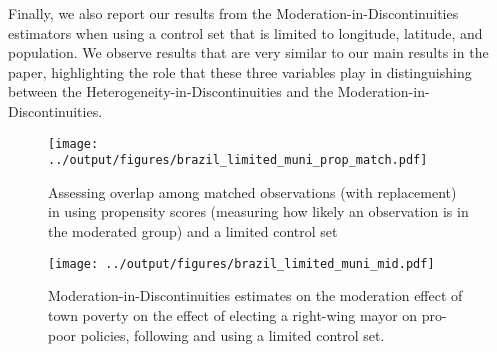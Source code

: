 \documentclass[12pt]{article}
\begin{document}
Finally, we also report our results from the Moderation-in-Discontinuities estimators when using a control set that is limited to longitude, latitude, and population. We observe results that are very similar to our main results in the paper, highlighting the role that these three variables play in distinguishing between the Heterogeneity-in-Discontinuities and the Moderation-in-Discontinuities.

\begin{figure}[htbp]
  \centering
  \texttt{[image: ../output/figures/brazil\_limited\_muni\_prop\_match.pdf]}
  \caption{Assessing overlap among matched observations (with replacement) in \citet{desai2021} using propensity scores (measuring how likely an observation is in the moderated group) and a limited control set}
  \label{fig:kernelsens_limited}
\end{figure}

\begin{figure}[htbp]
  \centering
  \texttt{[image: ../output/figures/brazil\_limited\_muni\_mid.pdf]}
  \caption{Moderation-in-Discontinuities estimates on the moderation effect of town poverty on the effect of electing a right-wing mayor on pro-poor policies, following \citet*{desai2021} and using a limited control set.}
  \label{fig:mid_brazil_limited}
\end{figure}
\end{document}
